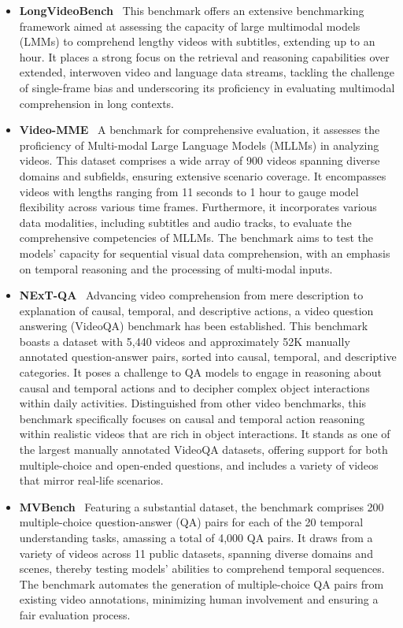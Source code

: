 \begin{itemize}[leftmargin=10pt]
\item \textbf{LongVideoBench}~\cite{wu2024longvideobench}
This benchmark offers an extensive benchmarking framework aimed at assessing the capacity of large multimodal models (LMMs) to comprehend lengthy videos with subtitles, extending up to an hour. It places a strong focus on the retrieval and reasoning capabilities over extended, interwoven video and language data streams, tackling the challenge of single-frame bias and underscoring its proficiency in evaluating multimodal comprehension in long contexts.

\item \textbf{Video-MME}~\cite{fu2024video}
A benchmark for comprehensive evaluation, it assesses the proficiency of Multi-modal Large Language Models (MLLMs) in analyzing videos. This dataset comprises a wide array of 900 videos spanning diverse domains and subfields, ensuring extensive scenario coverage. It encompasses videos with lengths ranging from 11 seconds to 1 hour to gauge model flexibility across various time frames. Furthermore, it incorporates various data modalities, including subtitles and audio tracks, to evaluate the comprehensive competencies of MLLMs. The benchmark aims to test the models' capacity for sequential visual data comprehension, with an emphasis on temporal reasoning and the processing of multi-modal inputs.

\item \textbf{NExT-QA}~\cite{xiao2021next}
Advancing video comprehension from mere description to explanation of causal, temporal, and descriptive actions, a video question answering (VideoQA) benchmark has been established. This benchmark boasts a dataset with 5,440 videos and approximately 52K manually annotated question-answer pairs, sorted into causal, temporal, and descriptive categories. It poses a challenge to QA models to engage in reasoning about causal and temporal actions and to decipher complex object interactions within daily activities. Distinguished from other video benchmarks, this benchmark specifically focuses on causal and temporal action reasoning within realistic videos that are rich in object interactions. It stands as one of the largest manually annotated VideoQA datasets, offering support for both multiple-choice and open-ended questions, and includes a variety of videos that mirror real-life scenarios.

\item \textbf{MVBench}~\cite{2023videochat}
Featuring a substantial dataset, the benchmark comprises 200 multiple-choice question-answer (QA) pairs for each of the 20 temporal understanding tasks, amassing a total of 4,000 QA pairs. It draws from a variety of videos across 11 public datasets, spanning diverse domains and scenes, thereby testing models' abilities to comprehend temporal sequences. The benchmark automates the generation of multiple-choice QA pairs from existing video annotations, minimizing human involvement and ensuring a fair evaluation process.


\end{itemize}
